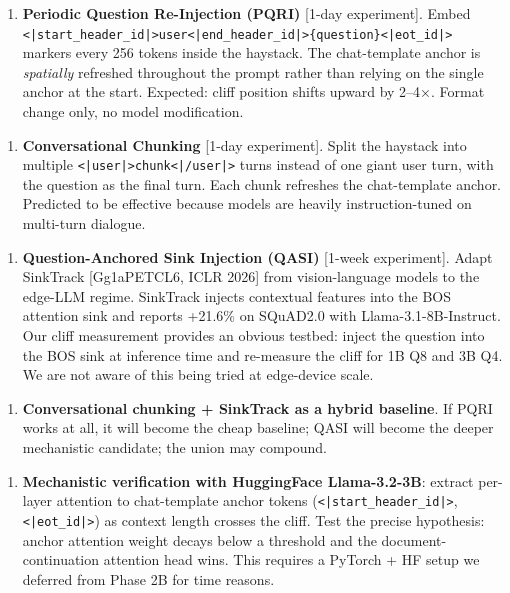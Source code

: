 \documentclass[11pt]{article}
\begin{document}
\begin{enumerate}
\item \textbf{Periodic Question Re-Injection (PQRI)} [1-day experiment]. Embed \texttt{<|start\_header\_id|>user<|end\_header\_id|>\{question\}<|eot\_id|>} markers every 256 tokens inside the haystack. The chat-template anchor is \textit{spatially} refreshed throughout the prompt rather than relying on the single anchor at the start. Expected: cliff position shifts upward by 2–4×. Format change only, no model modification.
\end{enumerate}


\begin{enumerate}
\item \textbf{Conversational Chunking} [1-day experiment]. Split the haystack into multiple \texttt{<|user|>chunk<|/user|>} turns instead of one giant user turn, with the question as the final turn. Each chunk refreshes the chat-template anchor. Predicted to be effective because models are heavily instruction-tuned on multi-turn dialogue.
\end{enumerate}


\begin{enumerate}
\item \textbf{Question-Anchored Sink Injection (QASI)} [1-week experiment]. Adapt SinkTrack [Gg1aPETCL6, ICLR 2026] from vision-language models to the edge-LLM regime. SinkTrack injects contextual features into the BOS attention sink and reports +21.6\% on SQuAD2.0 with Llama-3.1-8B-Instruct. Our cliff measurement provides an obvious testbed: inject the question into the BOS sink at inference time and re-measure the cliff for 1B Q8 and 3B Q4. We are not aware of this being tried at edge-device scale.
\end{enumerate}


\begin{enumerate}
\item \textbf{Conversational chunking + SinkTrack as a hybrid baseline}. If PQRI works at all, it will become the cheap baseline; QASI will become the deeper mechanistic candidate; the union may compound.
\end{enumerate}


\begin{enumerate}
\item \textbf{Mechanistic verification with HuggingFace Llama-3.2-3B}: extract per-layer attention to chat-template anchor tokens (\texttt{<|start\_header\_id|>}, \texttt{<|eot\_id|>}) as context length crosses the cliff. Test the precise hypothesis: anchor attention weight decays below a threshold and the document-continuation attention head wins. This requires a PyTorch + HF setup we deferred from Phase 2B for time reasons.
\end{enumerate}
\end{document}
